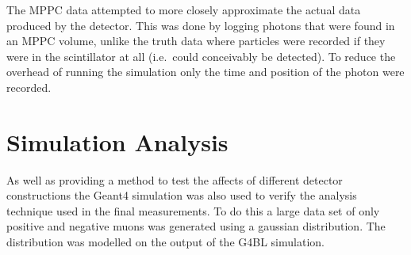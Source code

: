 The MPPC data attempted to more closely approximate the actual data produced by the detector. This was done by logging photons that were found in an MPPC volume, unlike the truth data where particles were recorded if they were in the scintillator at all (i.e.\  could conceivably be detected). To reduce the overhead of running the simulation only the time and position of the photon were recorded.


\section{Simulation Analysis} %
\label{cha:simulation_analysis}

As well as providing a method to test the affects of different detector constructions the Geant4 simulation was also used to verify the analysis technique used in the final measurements. To do this a large data set of only positive and negative muons was generated using a gaussian distribution. The distribution was modelled on the output of the G4BL simulation.




